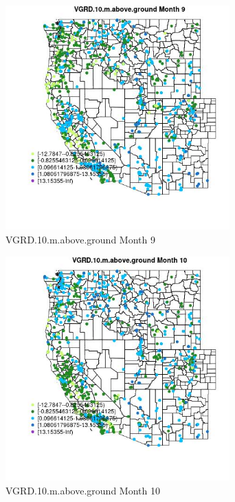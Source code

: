 \begin{figure} 
\centering  
\includegraphics[width=0.77\textwidth]{Code_Outputs/Report_ML_input_PM25_Step4_part_e_de_duplicated_aves_compiled_2019-05-21wNAs_MapObsMo9VGRD10maboveground.jpg} 
\caption{\label{fig:Report_ML_input_PM25_Step4_part_e_de_duplicated_aves_compiled_2019-05-21wNAsMapObsMo9VGRD10maboveground}VGRD.10.m.above.ground Month 9} 
\end{figure} 
 

\begin{figure} 
\centering  
\includegraphics[width=0.77\textwidth]{Code_Outputs/Report_ML_input_PM25_Step4_part_e_de_duplicated_aves_compiled_2019-05-21wNAs_MapObsMo10VGRD10maboveground.jpg} 
\caption{\label{fig:Report_ML_input_PM25_Step4_part_e_de_duplicated_aves_compiled_2019-05-21wNAsMapObsMo10VGRD10maboveground}VGRD.10.m.above.ground Month 10} 
\end{figure} 
 

